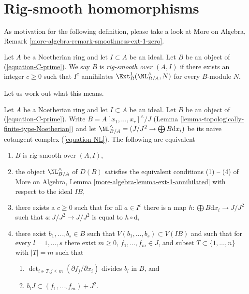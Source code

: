 \section{Rig-smooth homomorphisms}
\label{section-rig-smooth}

\noindent
As motivation for the following definition, please take a look at
More on Algebra, Remark \ref{more-algebra-remark-smoothness-ext-1-zero}.

\begin{definition}
\label{definition-rig-smooth-homomorphism}
Let $A$ be a Noetherian ring and let $I \subset A$ be an ideal.
Let $B$ be an object of (\ref{equation-C-prime}). We say
$B$ is {\it rig-smooth over $(A, I)$} if there exists an integer $c \geq 0$
such that $I^c$ annihilates $\Ext^1_B(\NL_{B/A}^\wedge, N)$ for every
$B$-module $N$.
\end{definition}

\noindent
Let us work out what this means.

\begin{lemma}
\label{lemma-equivalent-with-artin-smooth}
Let $A$ be a Noetherian ring and let $I \subset A$ be an ideal.
Let $B$ be an object of (\ref{equation-C-prime}). Write
$B = A[x_1, \ldots, x_r]^\wedge/J$
(Lemma \ref{lemma-topologically-finite-type-Noetherian})
and let $\NL_{B/A}^\wedge = (J/J^2 \to \bigoplus B\text{d}x_i)$
be its naive cotangent complex (\ref{equation-NL}).
The following are equivalent
\begin{enumerate}
\item $B$ is rig-smooth over $(A, I)$,
\item the object $\NL_{B/A}^\wedge$ of $D(B)$ satisfies the equivalent
conditions (1) -- (4) of More on Algebra, Lemma
\ref{more-algebra-lemma-ext-1-annihilated} with respect to the ideal $IB$,
\item there exists a $c \geq 0$ such that for all $a \in I^c$
there is a map $h : \bigoplus B\text{d}x_i \to J/J^2$ such that
$a : J/J^2 \to J/J^2$ is equal to $h \circ \text{d}$,
\item there exist $b_1, \ldots, b_s \in B$ such that
$V(b_1, \ldots, b_s) \subset V(IB)$ and such that for every
$l = 1, \ldots, s$ there exist $m \geq 0$, $f_1, \ldots, f_m \in J$,
and subset $T \subset \{1, \ldots, n\}$ with $|T| = m$ such that
\begin{enumerate}
\item $\det_{i \in T, j \leq m}(\partial f_j/ \partial x_i)$
divides $b_l$ in $B$, and
\item $b_l J \subset (f_1, \ldots, f_m) + J^2$.
\end{enumerate}
\end{enumerate}
\end{lemma}

